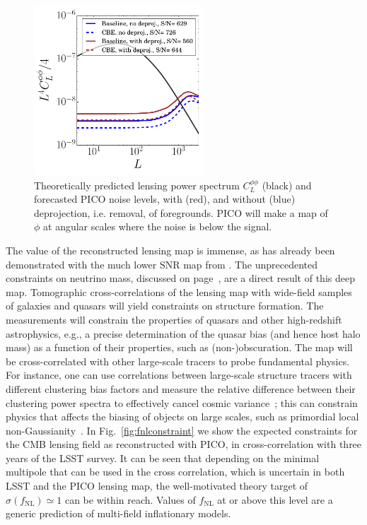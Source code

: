 \documentclass[PICOReport.tex]{subfiles}
\begin{document}
\begin{figure}
\hspace{-0.2in}
\parbox{3.0in}{\centerline {
\includegraphics[width=2.5in]{images/lensingNoisePICO.pdf} } }
\hspace{0.in}
\parbox{3.3in}{
\caption{\captiontext 
Theoretically predicted lensing power spectrum $C_{L}^{\phi \phi}$ (black) and forecasted PICO noise levels, with (red), and without (blue) deprojection, i.e. removal, of foregrounds. PICO will make a map of $\phi$ at angular scales where the noise is below the signal.  
\label{fig:lensingNoisePICO} 
} }
\vspace{-0.1in}
\end{figure}

The value of the reconstructed lensing map is immense, as has already been demonstrated with the much lower \ac{SNR} map from \planck . The unprecedented constraints on neutrino mass, discussed on page~\pageref{neutrino_fundamental}, are a direct result of this deep map. Tomographic cross-correlations of the lensing map with wide-field samples of galaxies and quasars will yield constraints on structure formation. The measurements will constrain the properties of quasars and other high-redshift astrophysics, e.g., a precise determination of the quasar bias (and hence host halo mass) as a function of their properties, such as (non-)obscuration. The map will be cross-correlated with other large-scale tracers to probe fundamental physics.  For instance, one can use correlations between large-scale structure tracers with different clustering bias factors and measure the relative difference between their clustering power spectra to effectively cancel cosmic variance~\citep{2009PhRvL.102b1302S,2018PhRvD..97l3540S}; this can constrain physics that affects the biasing of objects on large scales, such as primordial local non-Gaussianity~\citep{2008PhRvD..77l3514D}.  In Fig.~\ref{fig:fnlconstraint} we show the expected constraints for the CMB lensing field as reconstructed with PICO, in cross-correlation with  three years of the LSST survey. It can be seen that depending on the minimal multipole that can be used in the cross correlation, which is uncertain in both LSST and the PICO lensing map, the well-motivated theory target of $\sigma (f_\mathrm{NL}) \simeq 1$ \citep{2014arXiv1412.4671A} can be within reach. Values of $f_\mathrm{NL}$ at or above this level are a generic prediction of multi-field inflationary models.
\end{document}
